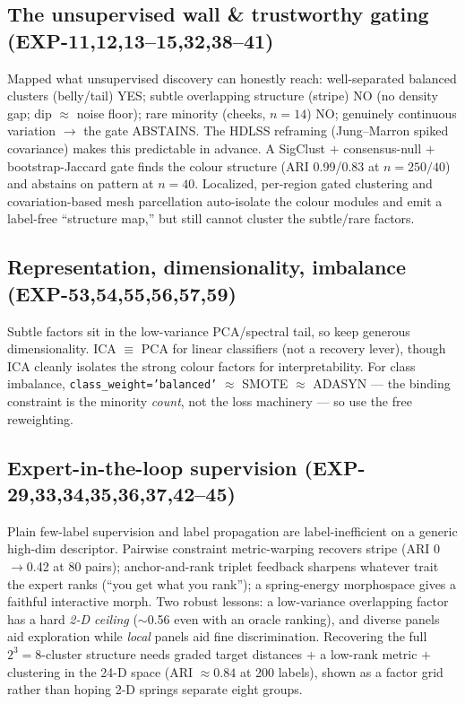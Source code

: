 \documentclass[11pt]{article}
\newcommand{\code}[1]{\texttt{#1}}
\begin{document}
\subsection{The unsupervised wall \& trustworthy gating (EXP-11,12,13--15,32,38--41)}
Mapped what unsupervised discovery can honestly reach: well-separated balanced clusters (belly/tail) YES;
subtle overlapping structure (stripe) NO (no density gap; dip $\approx$ noise floor); rare minority (cheeks,
$n{=}14$) NO; genuinely continuous variation $\rightarrow$ the gate ABSTAINS. The HDLSS reframing (Jung--Marron
spiked covariance) makes this predictable in advance. A SigClust $+$ consensus-null $+$ bootstrap-Jaccard gate
finds the colour structure (ARI 0.99/0.83 at $n{=}250/40$) and abstains on pattern at $n{=}40$. Localized,
per-region gated clustering and covariation-based mesh parcellation auto-isolate the colour modules and emit a
label-free ``structure map,'' but still cannot cluster the subtle/rare factors.

\subsection{Representation, dimensionality, imbalance (EXP-53,54,55,56,57,59)}
Subtle factors sit in the low-variance PCA/spectral tail, so keep generous dimensionality. ICA $\equiv$ PCA for
linear classifiers (not a recovery lever), though ICA cleanly isolates the strong colour factors for
interpretability. For class imbalance, \code{class\_weight='balanced'} $\approx$ SMOTE $\approx$ ADASYN --- the
binding constraint is the minority \emph{count}, not the loss machinery --- so use the free reweighting.

\subsection{Expert-in-the-loop supervision (EXP-29,33,34,35,36,37,42--45)}
Plain few-label supervision and label propagation are label-inefficient on a generic high-dim descriptor.
Pairwise constraint metric-warping recovers stripe (ARI 0$\rightarrow$0.42 at 80 pairs); anchor-and-rank
triplet feedback sharpens whatever trait the expert ranks (``you get what you rank''); a spring-energy
morphospace gives a faithful interactive morph. Two robust lessons: a low-variance overlapping factor has a hard
\emph{2-D ceiling} ($\sim$0.56 even with an oracle ranking), and diverse panels aid exploration while
\emph{local} panels aid fine discrimination. Recovering the full $2^3{=}8$-cluster structure needs graded target
distances $+$ a low-rank metric $+$ clustering in the 24-D space (ARI $\approx 0.84$ at 200 labels), shown as a
factor grid rather than hoping 2-D springs separate eight groups.
\end{document}
